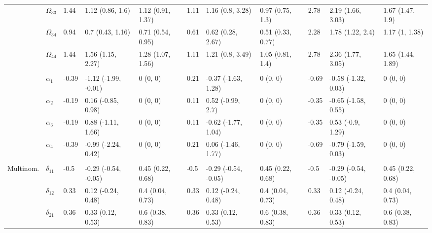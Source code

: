 \documentclass[]{article}
\begin{document}
\begin{landscape}
\begin{table}[t]
\begin{tabular}{lllllllllll}
\hspace{1em} & $\Omega_{33}$ & 1.44 & 1.12 (0.86, 1.6) & 1.12 (0.91, 1.37) & 1.11 & 1.16 (0.8, 3.28) & 0.97 (0.75, 1.3) & 2.78 & 2.19 (1.66, 3.03) & 1.67 (1.47, 1.9)\\
\hspace{1em} & $\Omega_{34}$ & 0.94 & 0.7 (0.43, 1.16) & 0.71 (0.54, 0.95) & 0.61 & 0.62 (0.28, 2.67) & 0.51 (0.33, 0.77) & 2.28 & 1.78 (1.22, 2.4) & 1.17 (1, 1.38)\\
\hspace{1em} & $\Omega_{44}$ & 1.44 & 1.56 (1.15, 2.27) & 1.28 (1.07, 1.56) & 1.11 & 1.21 (0.8, 3.49) & 1.05 (0.81, 1.4) & 2.78 & 2.36 (1.77, 3.05) & 1.65 (1.44, 1.89)\\
\addlinespace[0.3em]
\multicolumn{11}{l}{\textbf{ }}\\
\hspace{1em} & $\alpha_{1}$ & -0.39 & -1.12 (-1.99, -0.01) & 0 (0, 0) & 0.21 & -0.37 (-1.63, 1.28) & 0 (0, 0) & -0.69 & -0.58 (-1.32, 0.03) & 0 (0, 0)\\
\hspace{1em} & $\alpha_{2}$ & -0.19 & 0.16 (-0.85, 0.98) & 0 (0, 0) & 0.11 & 0.52 (-0.99, 2.7) & 0 (0, 0) & -0.35 & -0.65 (-1.58, 0.55) & 0 (0, 0)\\
\hspace{1em} & $\alpha_{3}$ & -0.19 & 0.88 (-1.11, 1.66) & 0 (0, 0) & 0.11 & -0.62 (-1.77, 1.04) & 0 (0, 0) & -0.35 & 0.53 (-0.9, 1.29) & 0 (0, 0)\\
\hspace{1em} & $\alpha_{4}$ & -0.39 & -0.99 (-2.24, 0.42) & 0 (0, 0) & 0.21 & 0.06 (-1.46, 1.77) & 0 (0, 0) & -0.69 & -0.79 (-1.59, 0.03) & 0 (0, 0)\\
\addlinespace[0.3em]
\multicolumn{11}{l}{\textbf{ }}\\
\hspace{1em}Multinom. & $\delta_{11}$ & -0.5 & -0.29 (-0.54, -0.05) & 0.45 (0.22, 0.68) & -0.5 & -0.29 (-0.54, -0.05) & 0.45 (0.22, 0.68) & -0.5 & -0.29 (-0.54, -0.05) & 0.45 (0.22, 0.68)\\
\hspace{1em} & $\delta_{12}$ & 0.33 & 0.12 (-0.24, 0.48) & 0.4 (0.04, 0.73) & 0.33 & 0.12 (-0.24, 0.48) & 0.4 (0.04, 0.73) & 0.33 & 0.12 (-0.24, 0.48) & 0.4 (0.04, 0.73)\\
\hspace{1em} & $\delta_{21}$ & 0.36 & 0.33 (0.12, 0.53) & 0.6 (0.38, 0.83) & 0.36 & 0.33 (0.12, 0.53) & 0.6 (0.38, 0.83) & 0.36 & 0.33 (0.12, 0.53) & 0.6 (0.38, 0.83)\\

\end{tabular}
\end{table}
\end{landscape}
\end{document}
